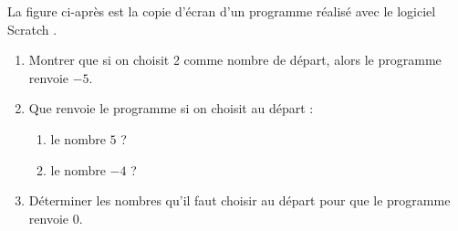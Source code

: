 
\medskip

La figure ci-après est la copie d'écran d'un programme réalisé avec le logiciel
\og Scratch \fg.

\medskip

\parbox{0.48\linewidth}{\begin{enumerate}
\item Montrer que si on choisit 2 comme
nombre de départ, alors le programme renvoie $- 5$.
\item Que renvoie le programme si on
choisit au départ :
	\begin{enumerate}
		\item le nombre $5$ ?
		\item le nombre $- 4$ ?
	\end{enumerate}
\item  Déterminer les nombres qu'il faut choisir au départ pour que le
programme renvoie $0$.
\end{enumerate}}\quad\hfill
\parbox{0.48\linewidth}{\small{%
\begin{scratch}
\end{scratch}
}
}	



